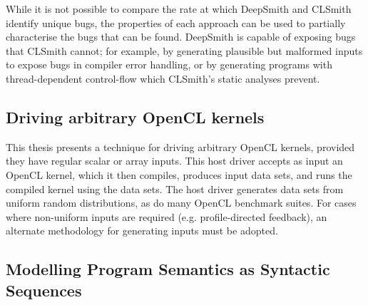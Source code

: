 While it is not possible to compare the rate at which DeepSmith and CLSmith identify unique bugs, the properties of each approach can be used to partially characterise the bugs that can be found. DeepSmith is capable of exposing bugs that CLSmith cannot; for example, by generating plausible but malformed inputs to expose bugs in compiler error handling, or by generating programs with thread-dependent control-flow which CLSmith's static analyses prevent.



\subsection{Driving arbitrary OpenCL kernels}

This thesis presents a technique for driving arbitrary OpenCL kernels, provided they have regular scalar or array inputs. This host driver accepts as input an OpenCL kernel, which it then compiles, produces input data sets, and runs the compiled kernel using the data sets. The host driver generates data sets from uniform random distributions, as do many OpenCL benchmark suites. For cases where non-uniform inputs are required (e.g. profile-directed feedback), an alternate methodology for generating inputs must be adopted.






\subsection{Modelling Program Semantics as Syntactic Sequences}

